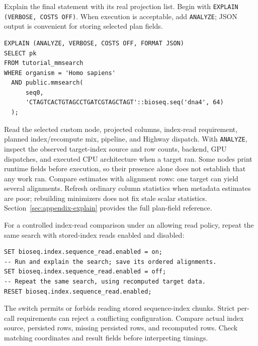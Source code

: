 Explain the final statement with its real projection list. Begin with
\texttt{EXPLAIN (VERBOSE, COSTS OFF)}. When execution is acceptable, add
\texttt{ANALYZE}; JSON output is convenient for storing selected plan fields.

\par\noindent\begin{minipage}{\linewidth}
\begin{lstlisting}[style=bioseq-appendix-sql]
EXPLAIN (ANALYZE, VERBOSE, COSTS OFF, FORMAT JSON)
SELECT pk
FROM tutorial_mmsearch
WHERE organism = 'Homo sapiens'
  AND public.mmsearch(
      seq0,
      'CTAGTCACTGTAGCCTGATCGTAGCTAGT'::bioseq.seq('dna4', 64)
  );
\end{lstlisting}
\end{minipage}

Read the selected custom node, projected columns, index-read requirement,
planned index/recompute mix, pipeline, and Highway dispatch. With
\texttt{ANALYZE}, inspect the observed target-index source and row counts,
backend, GPU dispatches, and executed CPU architecture when a target ran.
Some nodes print runtime fields before execution, so their presence alone
does not establish that any work ran. Compare estimates with alignment rows:
one target can yield several alignments. Refresh ordinary column statistics
when metadata estimates are poor; rebuilding minimizers does not fix stale
scalar statistics.
Section~\ref{sec:appendix-explain} provides the full plan-field reference.

For a controlled index-read comparison under an allowing read policy, repeat
the same search with stored-index reads enabled and disabled:

\par\noindent\begin{minipage}{\linewidth}
\begin{lstlisting}[style=bioseq-appendix-sql]
SET bioseq.index.sequence_read.enabled = on;
-- Run and explain the search; save its ordered alignments.
SET bioseq.index.sequence_read.enabled = off;
-- Repeat the same search, using recomputed target data.
RESET bioseq.index.sequence_read.enabled;
\end{lstlisting}
\end{minipage}

The switch permits or forbids reading stored sequence-index chunks. Strict
per-call requirements can reject a conflicting configuration. Compare actual
index source, persisted rows, missing persisted rows, and recomputed rows.
Check matching coordinates and result fields before interpreting timings.


